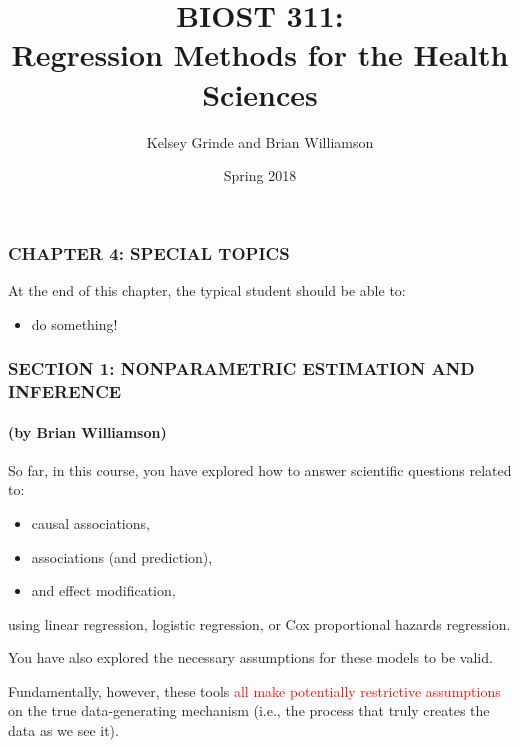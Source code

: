 \documentclass[12pt, 
hyperref={colorlinks=true, linkcolor=blue, urlcolor=cyan}]{beamer}
\title{BIOST 311: \\ Regression Methods for the Health Sciences}
\author{Kelsey Grinde and Brian Williamson}
\institute{UW Biostatistics}
\date{Spring 2018}
\begin{document}
\begin{frame}
\titlepage\thispagestyle{empty}
\end{frame}

  
\setcounter{framenumber}{\value{chap1}}

\begin{frame}
\frametitle{CHAPTER 4: SPECIAL TOPICS}
At the end of this chapter, the typical student should be able to:
\begin{itemize}
\item do something!
\end{itemize}
\end{frame}

\begin{frame}
\frametitle{SECTION 1: {\small NONPARAMETRIC ESTIMATION AND INFERENCE}}
\framesubtitle{(by Brian Williamson)}

So far, in this course, you have explored how to answer scientific questions related to: \vspace{-0.3cm}
\begin{itemize}
\item causal associations,
\item associations (and prediction),
\item and effect modification,
\end{itemize} \vspace{-0.3cm}
using linear regression, logistic regression, or Cox proportional hazards regression.

You have also explored the necessary assumptions for these models to be valid.

Fundamentally, however, these tools \textcolor{red}{all make potentially restrictive assumptions} on the true data-generating mechanism (i.e., the process that truly creates the data as we see it).
\end{frame}
\end{document}
